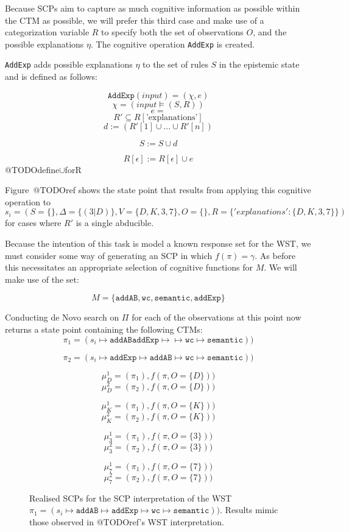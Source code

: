 Because SCPs aim to capture as much cognitive information as possible within the CTM as possible, we will prefer this third case and make use of a categorization variable $R$ to specify both the set of observations $O$, and the possible explanations $\eta$. The cognitive operation \texttt{AddExp} is created.

\texttt{AddExp} adds possible explanations $\eta$ to the set of rules $S$ in the epistemic state and is defined as follows:

\[\texttt{AddExp}(\textit{input})=(\chi,e)\]
\[\chi=(\textit{input}\models (S,R))\]
\[e=\]
\[R'\subseteq R[\textrm{'explanations'}]\]
\[d := (R'[1]\cup...\cup R'[n])\]

\[S:=S\cup d\]

\[R[\epsilon]:=R[\epsilon] \cup e\]
@TODOdefine$\cup$forR

Figure~@TODOref shows the state point that results from applying this cognitive operation to $s_i=(S=\{\},\Delta=\{(3|D)\},V=\{D,K,3,7\},O=\{\},R=\{'explanations':\{D,K,3,7\}\})$ for cases where $R'$ is a single abducible.

Because the intention of this task is model a known response set for the WST, we must consider some way of generating an SCP in which $f(\pi)= \gamma$. As before this necessitates an appropriate selection of cognitive functions for $M$. We will make use of the set:

\[
M=\{\texttt{addAB},\texttt{wc},\texttt{semantic}, \texttt{addExp}\}
\]

Conducting de Novo search on $\Pi$ for each of the observations at this point now returns a state point containing the following CTMs:
\[
\pi_1=(s_i \longmapsto \texttt{addAB} \texttt{addExp} \longmapsto \longmapsto \texttt{wc} \longmapsto \texttt{semantic}))
\]

\[
\pi_2=(s_i \longmapsto \texttt{addExp} \longmapsto \texttt{addAB} \longmapsto \texttt{wc} \longmapsto \texttt{semantic}))
\]


\[
\mu_D^1=(\pi_1), f(\pi, O=\{D\}))
\]
\[
\mu_D^2=(\pi_2), f(\pi, O=\{D\}))
\]

\[
\mu_K^1=(\pi_1), f(\pi, O=\{K\}))
\]
\[
\mu_K^2=(\pi_2), f(\pi, O=\{K\}))
\]

\[
\mu_3^1=(\pi_1), f(\pi, O=\{3\}))
\]
\[
\mu_3^2=(\pi_2), f(\pi, O=\{3\}))
\]

\[
\mu_7^1=(\pi_1), f(\pi, O=\{7\}))
\]
\[
\mu_7^2=(\pi_2), f(\pi, O=\{7\}))
\]

\begin{figure}
\label{fig:rSCP_WST}
\caption{Realised SCPs for the SCP interpretation of the WST $\pi_1=(s_i \longmapsto \texttt{addAB} \longmapsto \texttt{addExp}  \longmapsto \texttt{wc} \longmapsto \texttt{semantic}))$. Results mimic those observed in @TODOref's WST interpretation.}
\end{figure}

